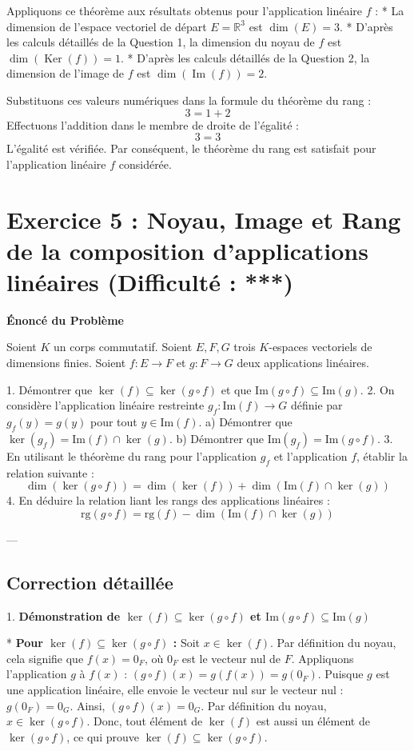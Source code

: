 \documentclass{report}
\begin{document}
Appliquons ce théorème aux résultats obtenus pour l'application linéaire $f$ :
*   La dimension de l'espace vectoriel de départ $E = \mathbb{R}^3$ est $\dim(E) = 3$.
*   D'après les calculs détaillés de la Question 1, la dimension du noyau de $f$ est $\dim(\operatorname{Ker}(f)) = 1$.
*   D'après les calculs détaillés de la Question 2, la dimension de l'image de $f$ est $\dim(\operatorname{Im}(f)) = 2$.

Substituons ces valeurs numériques dans la formule du théorème du rang :
$$ 3 = 1 + 2 $$
Effectuons l'addition dans le membre de droite de l'égalité :
$$ 3 = 3 $$
L'égalité est vérifiée. Par conséquent, le théorème du rang est satisfait pour l'application linéaire $f$ considérée.

\newpage
\chapter*{Exercice 5 : Noyau, Image et Rang de la composition d'applications linéaires (Difficulté : ***)}

\textbf{Énoncé du Problème}

Soient $K$ un corps commutatif. Soient $E, F, G$ trois $K$-espaces vectoriels de dimensions finies.
Soient $f: E \to F$ et $g: F \to G$ deux applications linéaires.

1.  Démontrer que $\ker(f) \subseteq \ker(g \circ f)$ et que $\text{Im}(g \circ f) \subseteq \text{Im}(g)$.
2.  On considère l'application linéaire restreinte $g_f: \text{Im}(f) \to G$ définie par $g_f(y) = g(y)$ pour tout $y \in \text{Im}(f)$.
    a) Démontrer que $\ker(g_f) = \text{Im}(f) \cap \ker(g)$.
    b) Démontrer que $\text{Im}(g_f) = \text{Im}(g \circ f)$.
3.  En utilisant le théorème du rang pour l'application $g_f$ et l'application $f$, établir la relation suivante :
    $$ \dim(\ker(g \circ f)) = \dim(\ker(f)) + \dim(\text{Im}(f) \cap \ker(g)) $$
4.  En déduire la relation liant les rangs des applications linéaires :
    $$ \text{rg}(g \circ f) = \text{rg}(f) - \dim(\text{Im}(f) \cap \ker(g)) $$

---

\section*{Correction détaillée}

1.  \textbf{Démonstration de $\ker(f) \subseteq \ker(g \circ f)$ et $\text{Im}(g \circ f) \subseteq \text{Im}(g)$}

    *   \textbf{Pour $\ker(f) \subseteq \ker(g \circ f)$ :}
        Soit $x \in \ker(f)$. Par définition du noyau, cela signifie que $f(x) = 0_F$, où $0_F$ est le vecteur nul de $F$.
        Appliquons l'application $g$ à $f(x)$ :
        $(g \circ f)(x) = g(f(x)) = g(0_F)$.
        Puisque $g$ est une application linéaire, elle envoie le vecteur nul sur le vecteur nul : $g(0_F) = 0_G$.
        Ainsi, $(g \circ f)(x) = 0_G$.
        Par définition du noyau, $x \in \ker(g \circ f)$.
        Donc, tout élément de $\ker(f)$ est aussi un élément de $\ker(g \circ f)$, ce qui prouve $\ker(f) \subseteq \ker(g \circ f)$.
\end{document}
